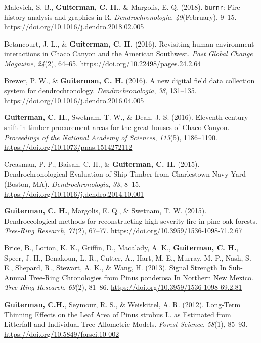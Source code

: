 \documentclass[11pt,a4paper,]{moderncv}
\begin{document}
\leavevmode\hypertarget{ref-Malevich2018}{}%
Malevich, S. B., \textbf{Guiterman, C. H.}, \& Margolis, E. Q. (2018).
\texttt{burnr}: Fire history analysis and graphics in R.
\emph{Dendrochronologia}, \emph{49}(February), 9--15.
\url{https://doi.org/10.1016/j.dendro.2018.02.005}

\leavevmode\hypertarget{ref-Betancourt2016}{}%
Betancourt, J. L., \& \textbf{Guiterman, C. H.} (2016). Revisiting
human-environment interactions in Chaco Canyon and the American
Southwest. \emph{Past Global Change Magazine}, \emph{24}(2), 64--65.
\url{https://doi.org/10.22498/pages.24.2.64}

\leavevmode\hypertarget{ref-Brewer2016}{}%
Brewer, P. W., \& \textbf{Guiterman, C. H.} (2016). A new digital field
data collection system for dendrochronology. \emph{Dendrochronologia},
\emph{38}, 131--135. \url{https://doi.org/10.1016/j.dendro.2016.04.005}

\leavevmode\hypertarget{ref-Guiterman2016}{}%
\textbf{Guiterman, C. H.}, Swetnam, T. W., \& Dean, J. S. (2016).
Eleventh-century shift in timber procurement areas for the great houses
of Chaco Canyon. \emph{Proceedings of the National Academy of Sciences},
\emph{113}(5), 1186--1190. \url{https://doi.org/10.1073/pnas.1514272112}

\leavevmode\hypertarget{ref-Creasman2014}{}%
Creasman, P. P., Baisan, C. H., \& \textbf{Guiterman, C. H.} (2015).
Dendrochronological Evaluation of Ship Timber from Charlestown Navy Yard
(Boston, MA). \emph{Dendrochronologia}, \emph{33}, 8--15.
\url{https://doi.org/10.1016/j.dendro.2014.10.001}

\leavevmode\hypertarget{ref-Guiterman2015}{}%
\textbf{Guiterman, C. H.}, Margolis, E. Q., \& Swetnam, T. W. (2015).
Dendroecological methods for reconstructing high severity fire in
pine-oak forests. \emph{Tree-Ring Research}, \emph{71}(2), 67--77.
\url{https://doi.org/10.3959/1536-1098-71.2.67}

\leavevmode\hypertarget{ref-Brice2013}{}%
Brice, B., Lorion, K. K., Griffin, D., Macalady, A. K.,
\textbf{Guiterman, C. H.}, Speer, J. H., Benakoun, L. R., Cutter, A.,
Hart, M. E., Murray, M. P., Nash, S. E., Shepard, R., Stewart, A. K., \&
Wang, H. (2013). Signal Strength In Sub-Annual Tree-Ring Chronologies
from Pinus ponderosa In Northern New Mexico. \emph{Tree-Ring Research},
\emph{69}(2), 81--86. \url{https://doi.org/10.3959/1536-1098-69.2.81}

\leavevmode\hypertarget{ref-Guiterman2012}{}%
\textbf{Guiterman, C.H.}, Seymour, R. S., \& Weiskittel, A. R. (2012).
Long-Term Thinning Effects on the Leaf Area of Pinus strobus L. as
Estimated from Litterfall and Individual-Tree Allometric Models.
\emph{Forest Science}, \emph{58}(1), 85--93.
\url{https://doi.org/10.5849/forsci.10-002}
\end{document}
